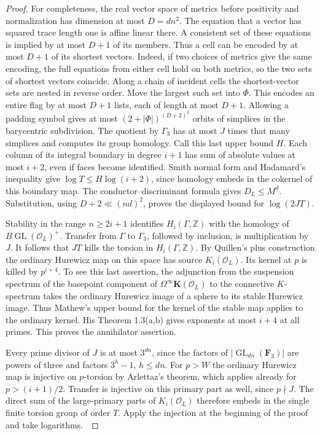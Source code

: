 \documentclass[a4paper,11pt]{article}
\theoremstyle{definition}
\theoremstyle{remark}
\newcommand{\ZZ}{\mathbb Z}\newcommand{\ord}{\operatorname{ord}}
\numberwithin{equation}{section}
\newcommand{\GL}{\operatorname{GL}}
\newcommand{\OO}{\mathcal O}
\begin{document}
\begin{proof}
For completeness, the real vector space of metrics before positivity and normalization has dimension at most \(D=dn^2\). The equation that a vector has squared trace length one is affine linear there. A consistent set of these equations is implied by at most \(D+1\) of its members. Thus a cell can be encoded by at most \(D+1\) of its shortest vectors. Indeed, if two choices of metrics give the same encoding, the full equations from either cell hold on both metrics, so the two sets of shortest vectors coincide. Along a chain of incident cells the shortest-vector sets are nested in reverse order. Move the largest such set into \(\Phi\). This encodes an entire flag by at most \(D+1\) lists, each of length at most \(D+1\). Allowing a padding symbol gives at most \((2+|\Phi|)^{(D+2)^2}\) orbits of simplices in the barycentric subdivision. The quotient by \(\Gamma_3\) has at most \(J\) times that many simplices and computes its group homology. Call this last upper bound \(H\). Each column of its integral boundary in degree \(i+1\) has sum of absolute values at most \(i+2\), even if faces become identified. Smith normal form and Hadamard's inequality give \(\log T\le H\log(i+2)\), since homology embeds in the cokernel of this boundary map. The conductor--discriminant formula gives \(D_L\le M^d\). Substitution, using \(D+2\ll(nd)^2\), proves the displayed bound for \(\log(2JT)\).

Stability in the range \(n\ge2i+1\) identifies \(H_i(\Gamma,\ZZ)\) with the homology of \(B\GL(\OO_L)^+\). Transfer from \(\Gamma\) to \(\Gamma_3\), followed by inclusion, is multiplication by \(J\). It follows that \(JT\) kills the torsion in \(H_i(\Gamma,\ZZ)\). By Quillen's plus construction the ordinary Hurewicz map on this space has source \(K_i(\OO_L)\). Its kernel at \(p\) is killed by \(p^{i+4}\). To see this last assertion, the adjunction from the suspension spectrum of the basepoint component of \(\Omega^\infty\mathbf K(\OO_L)\) to the connective \(K\)-spectrum takes the ordinary Hurewicz image of a sphere to its stable Hurewicz image. Thus Mathew's upper bound for the kernel of the stable map applies to the ordinary kernel. His Theorem 1.3(a,b) gives exponents at most \(i+4\) at all primes. This proves the annihilator assertion.~\cite[Sec.~3.1]{IV-II-III-beh}\cite[Thm.~1.3]{IV-II-III-mathew}

Every prime divisor of \(J\) is at most \(3^{dn}\), since the factors of \(|\GL_{dn}(\mathbf F_3)|\) are powers of three and factors \(3^h-1\), \(h\le dn\). For \(p>W\) the ordinary Hurewicz map is injective on \(p\)-torsion by Arlettaz's theorem, which applies already for \(p>(i+1)/2\). Transfer is injective on this primary part as well, since \(p\nmid J\). The direct sum of the large-primary parts of \(K_i(\OO_L)\) therefore embeds in the single finite torsion group of order \(T\). Apply the injection at the beginning of the proof and take logarithms.~\cite[Sec.~3.1]{IV-II-III-beh}
\end{proof}
\end{document}
